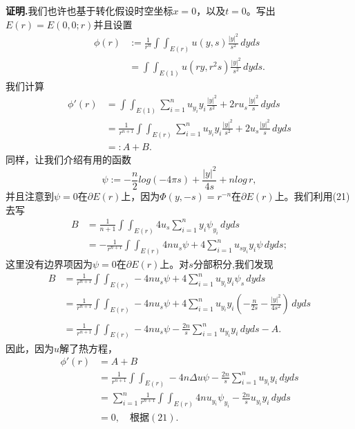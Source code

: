 \documentclass[leqno]{article}
\numberwithin{equation}{subsection}%
\begin{document}
\noindent\textbf{证明.}我们也许也基于转化假设时空坐标$x=0$，以及$t=0$。写出$E(r)=E(0,0;r)$并且设置
\begin{equation}
\begin{aligned}
\phi(r)&:=\frac{1}{r^{n}}\int\!\int_{E(r)}u(y,s)\frac{|y|^{2}}{s^{2}}\,dyds\\
&=\int\!\int_{E(1)}u(ry,r^{2}s)\frac{|y|^{2}}{s^{2}}\,dyds.
\end{aligned}
\end{equation}
我们计算
\begin{equation*}
	\begin{aligned}
	\phi'(r)&=\int\!\int_{E(1)}\sum_{i=1}^{n}u_{y_{i}}y_{i}\frac{|y|^{2}}{s^{2}}+2ru_{s}\frac{|y|^{2}}{s}\,dyds\\
	&=\frac{1}{r^{n+1}}\int\!\int_{E(r)}\sum_{i=1}^{n}u_{y_{i}}y_{i}\frac{|y|^{2}}{s^{2}}+2u_{s}\frac{|y|^{2}}{s}\,dyds\\
	&=:A+B.
	\end{aligned}
\end{equation*}
同样，让我们介绍有用的函数
\begin{equation}
	\psi:=-\frac{n}{2}log(-4\pi s )+\frac{|y|^{2}}{4s}+nlog\,r,
\end{equation}
并且注意到$\psi =0$在$\partial E(r)$上，因为$\Phi(y,-s)=r^{-n}$在$\partial E(r)$上。我们利用(21)去写
\begin{equation*}
	\begin{aligned}
	B&=\frac{1}{n+1}\int\!\int_{E(r)}4u_{s}\sum_{i=1}^{n}y_{i}\psi_{y_{i}}\,dyds\\
	&=-\frac{1}{r^{n+1}}\int\!\int_{E(r)}4nu_{s}\psi+4\sum_{i=1}^{n}u_{sy_{i}}y_{i}\psi\,dyds;
	\end{aligned}
\end{equation*}
这里没有边界项因为$\psi =0$在$\partial E(r)$上。对$s$分部积分,我们发现
\begin{equation*}
	\begin{aligned}
	B&=\frac{1}{r^{n+1}}\int\!\int_{E(r)}-4nu_{s}\psi+4\sum_{i=1}^{n}u_{y_{i}}y_{i}\psi_{s}\,dyds\\
	&=\frac{1}{r^{n+1}}\int\!\int_{E(r)}-4nu_{s}\psi+4\sum_{i=1}^{n}u_{y_{i}}y_{i}\left(-\frac{n}{2s}-\frac{|y|^{2}}{4s^{2}}\right)\,dyds\\\\
	&=\frac{1}{r^{n+1}}\int\!\int_{E(r)}-4nu_{s}\psi-\frac{2n}{s}\sum_{i=1}^{n}u_{y_{i}}y_{i}\,dyds-A.
	\end{aligned}
\end{equation*}
因此，因为$u$解了热方程，
\begin{equation*}
	\begin{aligned}
	\phi'(r)&=A+B\\
	&=\frac{1}{r^{n+1}}\int\!\int_{E(r)}-4n\Delta u\psi-\frac{2n}{s}\sum_{i=1}^{n}u_{y_{i}}y_{i}\,dyds\\
	&=\sum_{i=1}^{n}\frac{1}{r^{n+1}}\int\!\int_{E(r)}4nu_{y_{i}}\psi_{y_{i}}-\frac{2n}{s}u_{y_{i}}y_{i}\,dyds\\
	&=0,\quad\text{根据}(21).
	\end{aligned}
\end{equation*}
\end{document}
